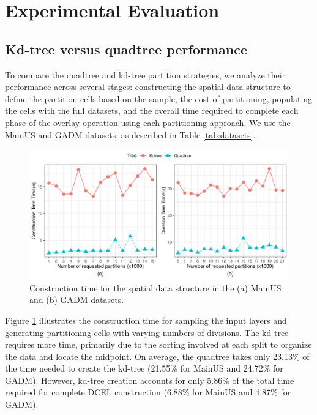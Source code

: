 \section{Experimental Evaluation} \label{sec:extension_experiments}

\subsection{Kd-tree versus quadtree performance} \label{sec:comparison}
To compare the quadtree and kd-tree partition strategies, we analyze their performance across several stages: constructing the spatial data structure to define the partition cells based on the sample, the cost of partitioning, populating the cells with the full datasets, and the overall time required to complete each phase of the overlay operation using each partitioning approach. We use the MainUS and GADM datasets, as described in Table \ref{tab:datasets}.

 \begin{figure}
    \centering
    \includegraphics[width=\textwidth]{chapterExtension/K/K_Creation}
    \caption{Construction time for the spatial data structure in the (a) MainUS and (b) GADM datasets.}\label{fig:k_creation_us}
 \end{figure}

Figure \ref{fig:k_creation_us} illustrates the construction time for sampling the input layers and generating partitioning cells with varying numbers of divisions. The kd-tree requires more time, primarily due to the sorting involved at each split to organize the data and locate the midpoint. On average, the quadtree takes only 23.13\% of the time needed to create the kd-tree (21.55\% for MainUS and 24.72\% for GADM). However, kd-tree creation accounts for only 5.86\% of the total time required for complete DCEL construction (6.88\% for MainUS and 4.87\% for GADM).

